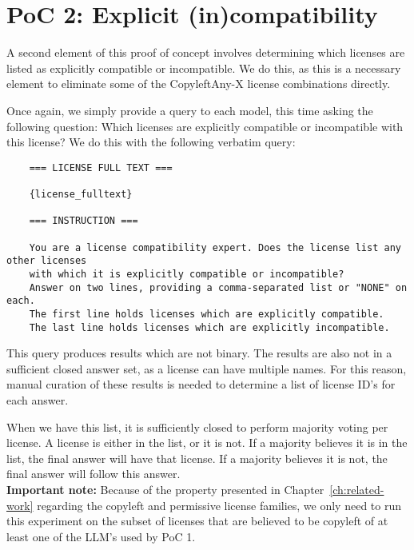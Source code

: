 \section{PoC 2: Explicit (in)compatibility}

A second element of this proof of concept involves determining which licenses are listed as explicitly compatible or incompatible. We do this, as this is a necessary element to eliminate some of the CopyleftAny-X license combinations directly.

Once again, we simply provide a query to each model, this time asking the following question: Which licenses are explicitly compatible or incompatible with this license? We do this with the following verbatim query:

\begin{verbatim}
	=== LICENSE FULL TEXT ===
	
	{license_fulltext}
	
	=== INSTRUCTION ===
	
	You are a license compatibility expert. Does the license list any other licenses
	with which it is explicitly compatible or incompatible?
	Answer on two lines, providing a comma-separated list or "NONE" on each.
	The first line holds licenses which are explicitly compatible.
	The last line holds licenses which are explicitly incompatible.
\end{verbatim}

This query produces results which are not binary. The results are also not in a sufficient closed answer set, as a license can have multiple names. For this reason, manual curation of these results is needed to determine a list of license ID's for each answer.

When we have this list, it is sufficiently closed to perform majority voting per license. A license is either in the list, or it is not. If a majority believes it is in the list, the final answer will have that license. If a majority believes it is not, the final answer will follow this answer. \\

\textbf{Important note:} Because of the property presented in Chapter~\ref{ch:related-work} regarding the copyleft and permissive license families, we only need to run this experiment on the subset of licenses that are believed to be copyleft of at least one of the LLM's used by PoC 1.